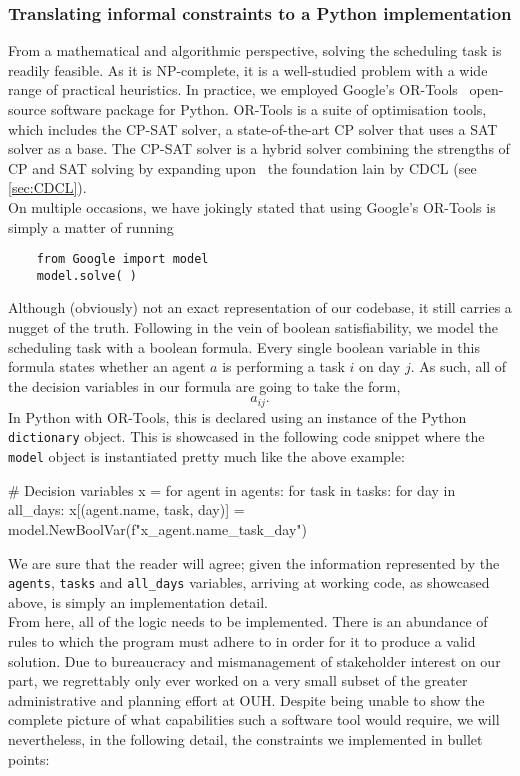 \subsubsection{Translating informal constraints to a Python implementation}\label{sec:translating-constraints}
From a mathematical and algorithmic perspective, solving the scheduling task is readily feasible. As it is NP-complete, it is a well-studied problem with a wide range of practical heuristics. In practice, we employed Google's OR-Tools~\cite{Wiki-OR-Tools} open-source software package for Python. OR-Tools is a suite of optimisation tools, which includes the CP-SAT solver, a state-of-the-art CP solver that uses a SAT solver as a base. The CP-SAT solver is a hybrid solver combining the strengths of CP and SAT solving by expanding upon~\cite{Lazy-Clause-Generation} the foundation lain by CDCL (see \autoref{sec:CDCL}).
\\
On multiple occasions, we have jokingly stated that using Google's OR-Tools is simply a matter of running
\begin{verbatim}
    from Google import model
    model.solve( )
\end{verbatim}
Although (obviously) not an exact representation of our codebase, it still carries a nugget of the truth. Following in the vein of boolean satisfiability, we model the scheduling task with a boolean formula. Every single boolean variable in this formula states whether an agent \(a\) is performing a task \(i\) on day \(j\). As such, all of the decision variables in our formula are going to take the form,
\begin{equation}\label{eq:decision-variable-form}
	a_{ij}.
\end{equation}
In Python with OR-Tools, this is declared using an instance of the Python \texttt{dictionary} object. This is showcased in the following code snippet where the \texttt{model} object is instantiated pretty much like the above example:
\begin{python}
# Decision variables
x = {}
for agent in agents:
    for task in tasks:
        for day in all_days:
            x[(agent.name, task, day)] = model.NewBoolVar(f"x_{agent.name}_{task}_{day}")
\end{python}
We are sure that the reader will agree; given the information represented by the \texttt{agents}, \texttt{tasks} and \texttt{all_days} variables, arriving at working code, as showcased above, is simply an implementation detail.
\\
From here, all of the logic needs to be implemented. There is an abundance of rules to which the program must adhere to in order for it to produce a valid solution. Due to bureaucracy and mismanagement of stakeholder interest on our part, we regrettably only ever worked on a very small subset of the greater administrative and planning effort at OUH. Despite being unable to show the complete picture of what capabilities such a software tool would require, we will nevertheless, in the following detail, the constraints we implemented in bullet points:
